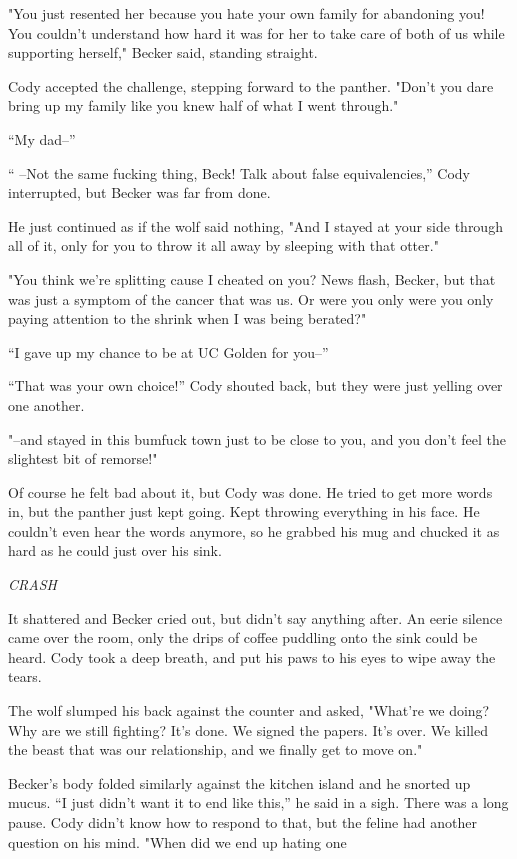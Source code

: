 "You just resented her because you hate your own family for abandoning
you! You couldn't understand how hard it was for her to take care of
both of us while supporting herself," Becker said, standing straight.

Cody accepted the challenge, stepping forward to the panther. "Don't you
dare bring up my family like you knew half of what I went through."

``My dad--''

`` --Not the same fucking thing, Beck! Talk about false equivalencies,''
Cody interrupted, but Becker was far from done.

He just continued as if the wolf said nothing, "And I stayed at your
side through all of it, only for you to throw it all away by sleeping
with that otter."

"You think we're splitting cause I cheated on you? News flash, Becker,
but that was just a symptom of the cancer that was us. Or were you only
were you only paying attention to the shrink when I was being berated?"

``I gave up my chance to be at UC Golden for you--''

``That was your own choice!'' Cody shouted back, but they were just
yelling over one another.

"--and stayed in this bumfuck town just to be close to you, and you
don't feel the slightest bit of remorse!"

Of course he felt bad about it, but Cody was done. He tried to get more
words in, but the panther just kept going. Kept throwing everything in
his face. He couldn't even hear the words anymore, so he grabbed his mug
and chucked it as hard as he could just over his sink.

\emph{CRASH}

It shattered and Becker cried out, but didn't say anything after. An
eerie silence came over the room, only the drips of coffee puddling onto
the sink could be heard. Cody took a deep breath, and put his paws to
his eyes to wipe away the tears.

The wolf slumped his back against the counter and asked, "What're we
doing? Why are we still fighting? It's done. We signed the papers. It's
over. We killed the beast that was our relationship, and we finally get
to move on."

Becker's body folded similarly against the kitchen island and he snorted
up mucus. ``I just didn't want it to end like this,'' he said in a sigh.
There was a long pause. Cody didn't know how to respond to that, but the
feline had another question on his mind. "When did we end up hating one

